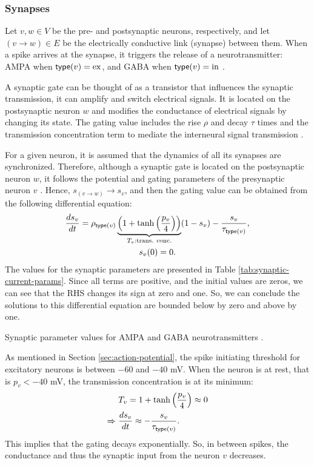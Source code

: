 \subsubsection{Synapses}

Let $v, w \in V$ be the pre- and postsynaptic neurons, respectively, and let $(v \to w) \in E$ be the electrically conductive link (synapse) between them. When a spike arrives at the synapse, it triggers the release of a neurotransmitter: AMPA when $\mathsf{type}(v) = \mathrm{ex}$, and GABA when $\mathsf{type}(v) = \mathrm{in}$ \cite{Lowet2015}.

A synaptic gate can be thought of as a transistor that influences the synaptic transmission, it can amplify and switch electrical signals. It is located on the postsynaptic neuron $w$ and modifies the conductance of electrical signals by changing its state. The gating value includes the rise $\rho$ and decay $\tau$ times and the transmission concentration term to mediate the interneural signal transmission \cite{Destexhe1994}.

For a given neuron, it is assumed that the dynamics of all its synapses are synchronized. Therefore, although a synaptic gate is located on the postsynaptic neuron $w$, it follows the potential and gating parameters of the presynaptic neuron $v$ \cite{Lowet2015}. Hence, $s_{(v \to w)} \to s_v$, and then the gating value can be obtained from the following differential equation:
\begin{gather}
    \frac{ds_v}{dt} = \rho_{\mathsf{type}(v)} \underbrace{\left( 1 + \tanh \left( \frac{p_{v}}{4} \right) \right)}_{T_v: \text{trans. conc.}} (1 - s_v) - \frac{s_v}{\tau_{\mathsf{type}(v)}}, \\
    \label{eq:synaptic-gates}
    s_v(0) = 0.
\end{gather}
The values for the synaptic parameters are presented in Table \ref{tab:synaptic-current-params}.
Since all terms are positive, and the initial values are zeros, we can see that the RHS changes its sign at zero and one. So, we can conclude the solutions to this differential equation are bounded below by zero and above by one.

\begin{table}[!htp] 
    \centering
    
    \caption[Synaptic parameter values]{Synaptic parameter values for AMPA and GABA neurotransmitters \cite{Lowet2015}.}
    \label{tab:synaptic-current-params}
\end{table}


As mentioned in Section \ref{sec:action-potential}, the spike initiating threshold for excitatory neurons is between $-60$ and $-40$ mV. When the neuron is at rest, that is $p_v < -40$ mV, the transmission concentration is at its minimum:
\begin{gather}
\begin{split}
    & T_v = 1 + \tanh \left( \frac{p_{v}}{4} \right) \approx 0 \\
    \Rightarrow \ & \frac{ds_v}{dt} \approx - \frac{s_v}{\tau_{\mathsf{type}(v)}}.
\end{split}
\end{gather}
This implies that the gating decays exponentially.
So, in between spikes, the conductance and thus the synaptic input from the neuron $v$ decreases. 

